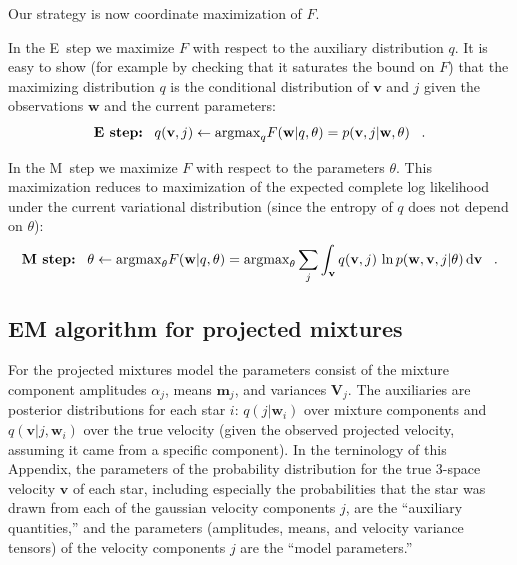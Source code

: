 \documentclass[12pt,preprint]{aastex}
\renewcommand{\vec}[1]{\mathbf{#1}} %
\newcommand{\mm}{\vec{m}}
\newcommand{\vv}{\vec{v}}
\newcommand{\ww}{\vec{w}}
\newcommand{\mmj}{\mm_j}
\newcommand{\wwi}{\ww_i}
\newcommand{\ten}[1]{\mathbf{#1}} %
\newcommand{\VV}{\ten{V}}
\newcommand{\VVj}{\VV_{\!j}} %
\begin{document}
Our strategy is now coordinate maximization of $F$.

In the E~step we maximize $F$ with respect to the auxiliary
distribution $q$. It is easy to show (for example by checking that
it saturates the bound on $F$) that the maximizing distribution $q$ is
the conditional distribution of $\vv$ and $j$ given the observations
$\ww$ and the current parameters:
\begin{equation}
\mbox{\textbf{E~step:}}\;\;\;
q(\vv,j) \leftarrow \mathrm{argmax}_q F(\ww|q,\theta) =  p(\vv,j|\ww,\theta) \;\;\;.
\end{equation}

In the M~step we maximize $F$ with respect to the parameters
$\theta$. This maximization reduces to maximization of the expected
complete log likelihood under the current variational distribution
(since the entropy of $q$ does not depend on $\theta$):
\begin{equation}
\mbox{\textbf{M~step:}}\;\;\;
\theta \leftarrow  \mathrm{argmax}_\theta F(\ww|q,\theta) =
\mathrm{argmax}_\theta \sum_j\int_{\vv} q(\vv,j)\,\ln
                  p(\ww,\vv,j|\theta)\,\mathrm{d}\vv \;\;\;.
\end{equation}


\subsection{EM algorithm for projected mixtures}

For the projected mixtures model the parameters consist of the mixture
component amplitudes $\alpha_j$, means $\mmj$, and variances
$\VVj$. The auxiliaries are posterior distributions for each star $i$:
$q(j|\wwi)$ over mixture components and $q(\vv|j,\wwi)$ over the true
velocity (given the observed projected velocity, assuming it came from
a specific component).  In the terninology of this Appendix, the
parameters of the probability distribution for the true 3-space
velocity $\vv$ of each star, including especially the probabilities
that the star was drawn from each of the gaussian velocity components
$j$, are the ``auxiliary quantities,'' and the parameters
(amplitudes, means, and velocity variance tensors) of the velocity
components $j$ are the ``model parameters.''
\end{document}
